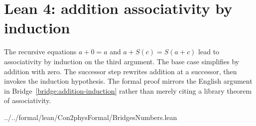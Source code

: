 \section{Lean 4: addition associativity by induction}
\label{sec:lean-bridge-09}
The recursive equations $a+0=a$ and $a+S(c)=S(a+c)$ lead to
associativity by induction on the third argument. The base case
simplifies by addition with zero. The successor step rewrites
addition at a successor, then invokes the induction hypothesis.
The formal proof mirrors the English argument in
Bridge~\ref{bridge:addition-induction} rather than merely citing
a library theorem of associativity.


{../../formal/lean/Con2physFormal/BridgesNumbers.lean}
